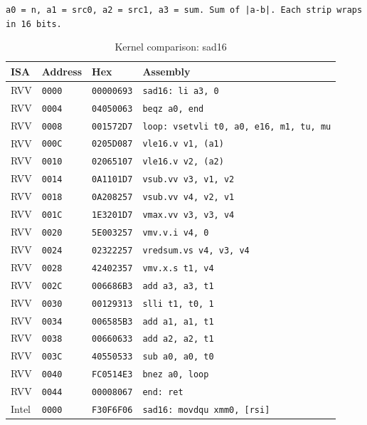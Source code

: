 \begin{table}[htbp]
\centering
\caption{Kernel comparison: sad16}
\begingroup
\scriptsize
\setlength{\tabcolsep}{4pt}
\noindent \texttt{a0 = n, a1 = src0, a2 = src1, a3 = sum. Sum of |a-b|. Each strip wraps in 16 bits.}\par
\vspace{0.6ex}
\begin{tabular}{@{}l|l|l|p{7.2cm}@{}}
\toprule
ISA & Address & Hex & Assembly \\
\midrule
RVV & \texttt{0000} & \texttt{00000693} & \texttt{sad16: li a3, 0} \\
RVV & \texttt{0004} & \texttt{04050063} & \texttt{beqz a0, end} \\
RVV & \texttt{0008} & \texttt{001572D7} & \texttt{loop: vsetvli t0, a0, e16, m1, tu, mu} \\
RVV & \texttt{000C} & \texttt{0205D087} & \texttt{vle16.v v1, (a1)} \\
RVV & \texttt{0010} & \texttt{02065107} & \texttt{vle16.v v2, (a2)} \\
RVV & \texttt{0014} & \texttt{0A1101D7} & \texttt{vsub.vv v3, v1, v2} \\
RVV & \texttt{0018} & \texttt{0A208257} & \texttt{vsub.vv v4, v2, v1} \\
RVV & \texttt{001C} & \texttt{1E3201D7} & \texttt{vmax.vv v3, v3, v4} \\
RVV & \texttt{0020} & \texttt{5E003257} & \texttt{vmv.v.i v4, 0} \\
RVV & \texttt{0024} & \texttt{02322257} & \texttt{vredsum.vs v4, v3, v4} \\
RVV & \texttt{0028} & \texttt{42402357} & \texttt{vmv.x.s t1, v4} \\
RVV & \texttt{002C} & \texttt{006686B3} & \texttt{add a3, a3, t1} \\
RVV & \texttt{0030} & \texttt{00129313} & \texttt{slli t1, t0, 1} \\
RVV & \texttt{0034} & \texttt{006585B3} & \texttt{add a1, a1, t1} \\
RVV & \texttt{0038} & \texttt{00660633} & \texttt{add a2, a2, t1} \\
RVV & \texttt{003C} & \texttt{40550533} & \texttt{sub a0, a0, t0} \\
RVV & \texttt{0040} & \texttt{FC0514E3} & \texttt{bnez a0, loop} \\
RVV & \texttt{0044} & \texttt{00008067} & \texttt{end: ret} \\
\midrule
Intel & \texttt{0000} & \texttt{F30F6F06} & \texttt{sad16: movdqu xmm0, [rsi]} \\

\end{tabular}
\end{table}
